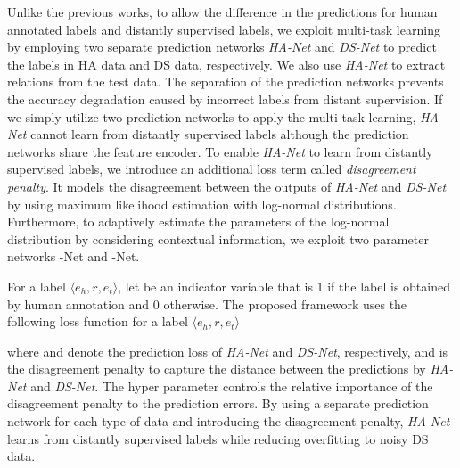 \documentclass[11pt]{article}
\newcommand{\triple}[3]{\ensuremath{\langle #1,#2,#3\rangle}}
\newcommand{\hanet}{\emph{HA-Net}\xspace}
\newcommand{\dsnet}{\emph{DS-Net}\xspace}
\newcommand{\munet}{-Net\xspace}
\newcommand{\sigmanet}{-Net\xspace}
\newcommand{\ehead}{e_{h}}
\newcommand{\etail}{e_{t}}
\begin{document}
Unlike the previous works, to allow the difference in the predictions for human annotated labels and distantly supervised labels, we exploit multi-task learning by employing two separate prediction networks \hanet and \dsnet to predict the labels in HA data and DS data, respectively.
We also use \hanet to extract relations from the test data.
The separation of the prediction networks prevents the accuracy degradation caused by incorrect labels from distant supervision.
If we simply utilize two prediction networks to apply the multi-task learning, \hanet cannot learn from distantly supervised labels although the prediction networks share the feature encoder.
To enable \hanet to learn from distantly supervised labels, we introduce an additional loss term called \emph{disagreement penalty}.
It models the disagreement between the outputs of \hanet and \dsnet by using maximum likelihood estimation with log-normal distributions.
Furthermore, to adaptively estimate the parameters of the log-normal distribution by considering contextual information, we exploit two parameter networks \munet and \sigmanet.



For a label \triple{\ehead}{r}{\etail}, 
let  be an indicator variable that is 1 if the label is obtained by human annotation and 0 otherwise.
The proposed framework uses the following loss function for a label \triple{\ehead}{r}{\etail}

where  and  denote the prediction loss of \hanet and \dsnet, respectively, and  is the disagreement penalty to capture the distance between the predictions by \hanet and \dsnet.
The hyper parameter  controls the relative importance of the disagreement penalty to the prediction errors.
By using a separate prediction network for each type of data and introducing the disagreement penalty, \hanet learns from distantly supervised labels while reducing overfitting to noisy DS data.
\end{document}
